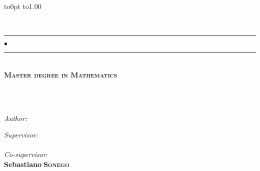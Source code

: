 

\begin{titlepage}
  \begin{center}
    \vbox to0pt{%
    \vbox to1.00\vss}
  \end{center}

\begin{center}

{{\huge\bfseries \textcolor{colTitle}{\univname}}\\\vspace{0.1cm}
{\large \textcolor{colTitle}{\deptname}}\par}%

\rule[0.1cm]{7cm}{0.5mm}
$\bullet$
\rule[0.1cm]{7cm}{0.5mm}\\[0.25cm]
\textsc{\Large \bfseries \textcolor{colTitle}{Master degree in Mathematics}}\\[0.2cm] %

\HRule \\[0.3cm] %
{\Huge {\bfseries \textcolor{colTitle}{\ttitle}}\par}\vspace{0.3cm} 
\HRule \\%
\end{center}
\vspace*{9.8cm}
\begin{center}
\end{center}
\begin{minipage}[t]{0.5\textwidth}
{%
\begin{flushleft} \large
\emph{Author:} \\
{\bf \authorname} %
\end{flushleft}
}
\end{minipage}
\begin{minipage}[t]{0.5\textwidth}
{%
\begin{flushright} \large
\emph{Supervisor:} \\
{\bf \supname}\\ %
\emph{Co-supervisor}: \\
{\bf Sebastiano$\;$\textsc{Sonego}}
\end{flushright}
}
\end{minipage}
 

\end{titlepage}
